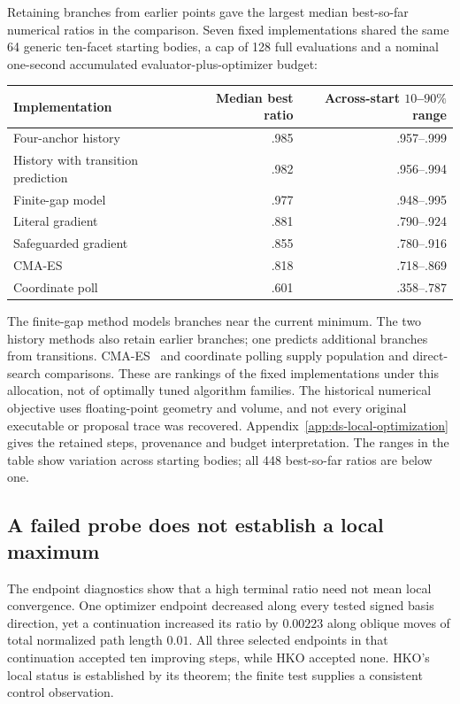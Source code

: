 Retaining branches from earlier points gave the largest median
best-so-far numerical ratios in the comparison. Seven fixed
implementations shared the same 64 generic ten-facet starting bodies, a cap
of 128 full evaluations and a nominal one-second accumulated
evaluator-plus-optimizer budget:
\begin{center}
\begin{tabular}{lrr}
\hline
Implementation & Median best ratio & Across-start $10$--$90\%$ range\\
\hline
Four-anchor history & .985 & .957--.999\\
History with transition prediction & .982 & .956--.994\\
Finite-gap model & .977 & .948--.995\\
Literal gradient & .881 & .790--.924\\
Safeguarded gradient & .855 & .780--.916\\
CMA-ES & .818 & .718--.869\\
Coordinate poll & .601 & .358--.787\\
\hline
\end{tabular}
\end{center}
The finite-gap method models branches near the current minimum. The two
history methods also retain earlier branches; one predicts additional
branches from transitions. CMA-ES~\cite{dsHansen2016} and coordinate polling
supply population and direct-search comparisons. These are rankings of
the fixed implementations under this allocation, not of optimally tuned
algorithm families. The historical numerical objective uses floating-point
geometry and volume, and not every original executable or proposal trace
was recovered. Appendix~\ref{app:ds-local-optimization} gives the retained
steps, provenance and budget interpretation. The ranges in the table
show variation across starting bodies; all 448 best-so-far ratios are below one.

\subsection{A failed probe does not establish a local maximum}

The endpoint diagnostics show that a high terminal ratio need not mean
local convergence. One optimizer endpoint decreased along every tested
signed basis direction, yet a continuation increased its ratio by
$0.00223$ along oblique moves of total normalized path length $0.01$.
All three selected endpoints in that continuation accepted ten improving
steps, while HKO accepted none. HKO's local status is established by its
theorem; the finite test supplies a consistent control observation.


